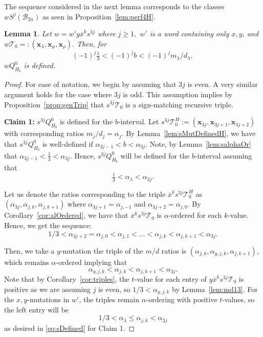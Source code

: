 \documentclass[11pt, reqno]{amsart}
\newtheorem{lemma}[thm]{Lemma}
\theoremstyle{remark}
\numberwithin{equation}{subsection}
\numberwithin{figure}{section}
\theoremstyle{customremark}
\newcommand{\Tt}{\mathcal{T}}
\newcommand{\ov}{\overline}
\newcommand{\al}{{\alpha}}
\newcommand{\la}{{\lambda}}
\begin{document}
The sequence considered in the next lemma corresponds to the classes $wS^j(\mathcal{B}_{2n})$ as seen in Proposition~\ref{lem:perf4H}. 
\begin{lemma} \label{lem:bDefH2}
Let $w=w'y\ov{x}^ks^{3j}$ where $j \geq 1,$ $w'$ is a word containing only $x,y$, and $w\Tt_0=:(\bm{x}_\la,\bm{x}_\mu,\bm{x}_\rho).$ Then, for \[ (-1)^j \tfrac13 < (-1)^jb<(-1)^jm_\la/d_\la,\]
 $wQ_{H_b}^0$ is defined. 
\end{lemma}
\begin{proof}

    For ease of notation, we begin by assuming that $3j$ is even. A very similar argument holds for the case where $3j$ is odd. This assumption implies by Proposition~\ref{prop:genTrip} that $s^{3j}\Tt_0$ is a sign-matching recursive triple. 

    {\bf Claim 1:} $s^{3j}Q_{H_b}^0$ is defined for the $b$-interval. 
    Let $s^{3j}\Tt_0^H:=(\bm{x}_{3j},\bm{x}_{3j+1},\bm{x}_{3j+2})$ with corresponding ratios $m_j/d_j=\al_j.$ By Lemma~\ref{lem:sMutDefinedH}, we have that $s^{3j}Q_{H_b}^0$ is well-defined if $   \al_{3j-1} < b < \al_{3j}.$ Note, by Lemma~\ref{lem:salphaOr} that $\al_{3j-1}<\tfrac13<\al_{3j}$. Hence, $s^{3j}Q_{H_b}^0$ will be defined for the $b$-interval assuming that \begin{equation} \label{eq:sDefined}
        \tfrac13<\al_\la<\al_{3j}.
    \end{equation}
 
	Let us denote the ratios corresponding to the triple $\ov{x}^ks^{3j}\Tt_0^H$ as 
	$(\al_{3j},\al_{j,k},\al_{j,k+1})$
	where $\al_{3j+1}=\al_{j,-1}$ and $\al_{3j+2}=\al_{j,0}$. By Corollary~\ref{cor:alOrdered}, we have that $\ov{x}^ks^{3j}\Tt_0$ is $\al$-ordered for each $k$-value. Hence, we get the sequence:  
	\[ 1/3 < \al_{3j+2}=\al_{j,0} < \al_{j,1} < \hdots <\al_{j,k} < \al_{j,k+1} < \al_{3j}.\]
  
	Then, we take a $y$-mutation the triple of the $m/d$ ratios is  $(\al_{j,k},\al_{y,j,k},\al_{j,k+1})$,
	which remains $\al$-ordered implying that 
	\[ \al_{y,j,k}< \al_{j,k} <\al_{j,k+1} < \al_{3j}.\]
    Note that by Corollary~\ref{cor:triples}, the $t$-value for each entry of $y\ov{x}^ks^{3j}\Tt_0$ is positive as we are assuming $j$ is even, so $1/3<\al_{y,j,k}$ by Lemma~\ref{lem:md13}. 
    For the $x,y$-mutations in $w'$, the triples remain $\al$-ordering with positive $t$-values, so the left entry will be
    \[ 1/3<\al_\la \leq \al_{j,k}<\al_{3j}\]
    as desired in \eqref{eq:sDefined} for Claim 1. 


\end{proof}
\end{document}
